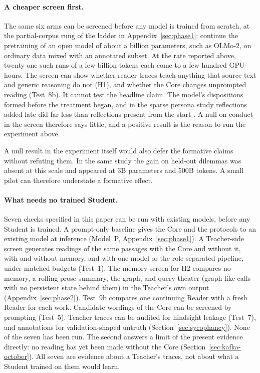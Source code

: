 \documentclass[11pt]{article}
\begin{document}
\paragraph{A cheaper screen first.}
The same six arms can be screened before any model is trained from scratch, at
the partial-corpus rung of the ladder in Appendix~\ref{sec:phase1}: continue
the pretraining of an open model of about a billion parameters, such as
OLMo-2, on ordinary data mixed with an annotated subset. At the rate reported
above, twenty-one such runs of a few billion tokens each come to a few hundred
GPU-hours. The screen can show whether reader traces teach anything that source
text and generic reasoning do not (H1), and whether the Core changes unprompted
reading (Test~8b). It cannot test the headline claim. The model's dispositions
formed before the treatment began, and in the sparse persona study reflections
added late did far less than reflections present from the start
\cite{minder2026spp}. A null on conduct in the screen therefore says little,
and a positive result is the reason to run the experiment above.

A null result in the experiment itself would also defer the formative claims
without refuting them. In the same study the gain on held-out dilemmas was
absent at this scale and appeared at 3B parameters and 500B tokens. A small
pilot can therefore understate a formative effect.

\paragraph{What needs no trained Student.}
Seven checks specified in this paper can be run with existing models, before
any Student is trained. A prompt-only baseline gives the Core and the protocols to
an existing model at inference (Model~P, Appendix~\ref{sec:phase1}). A
Teacher-side screen generates readings of the same passages with the Core and
without it, with and without memory, and with one model or the role-separated
pipeline, under matched budgets (Test~1). The memory screen for H2 compares no
memory, a rolling prose summary, the graph, and query theater (graph-like calls
with no persistent state behind them) in the Teacher's
own output (Appendix~\ref{sec:phase2}). Test~9b compares one continuing Reader
with a fresh Reader for each work. Candidate wordings of the Core can be
screened by prompting (Test~5). Teacher traces can be audited for hindsight
leakage (Test~7), and annotations for validation-shaped untruth
(Section~\ref{sec:sycophancy}). None of the seven has been run. The second
answers a limit of the present evidence directly: no reading has yet been made
without the Core (Section~\ref{sec:kafka-october}). All seven are evidence
about a Teacher's traces, not about what a Student trained on them would
learn.
\end{document}
